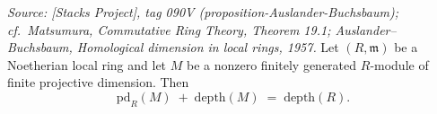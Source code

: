 \begin{theorem}

  \label{thm:auslander_buchsbaum}
  
  \textit{Source: [Stacks Project], tag 090V (proposition-Auslander-Buchsbaum); cf.\
  Matsumura, \emph{Commutative Ring Theory}, Theorem 19.1; Auslander--Buchsbaum,
  \emph{Homological dimension in local rings}, 1957.}
  Let \((R, \mathfrak{m})\) be a Noetherian local ring and let \(M\) be a nonzero finitely
  generated \(R\)-module of finite projective dimension. Then
  \[
    \text{pd}_R(M) \;+\; \text{depth}(M) \;=\; \text{depth}(R).
  \]
\end{theorem}

